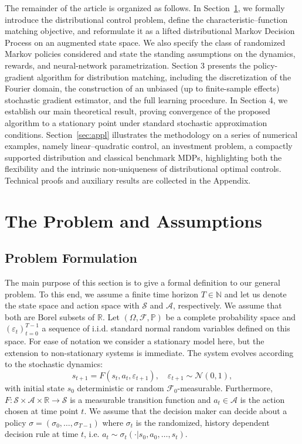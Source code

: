 \documentclass[reqno, 11pt]{amsart}%
\newcommand\cA{\mathcal A}
\newcommand\cS{\mathcal S}
\newcommand\RR{\mathbb R}
\theoremstyle{definition}
\begin{document}
The remainder of the article is organized as follows. In Section~\ref{sec:Problem+Ass}, we formally introduce the distributional control problem, define the characteristic–function matching objective, and reformulate it as a lifted distributional Markov Decision Process on an augmented state space. We also specify the class of randomized Markov policies considered and state the standing assumptions on the dynamics, rewards, and neural-network parametrization. Section 3 presents the policy-gradient algorithm for distribution matching, including the discretization of the Fourier domain, the construction of an unbiased (up to finite-sample effects) stochastic gradient estimator, and the full learning procedure. In Section 4, we establish our main theoretical result, proving convergence of the proposed algorithm to a stationary point under standard stochastic approximation conditions. Section~\ref{sec:appl} illustrates the methodology on a series of numerical examples, namely linear–quadratic control, an investment problem, a compactly supported distribution and classical benchmark MDPs, highlighting both the flexibility and the intrinsic non-uniqueness of distributional optimal controls. Technical proofs and auxiliary results are collected in the Appendix.

\section{The Problem and Assumptions}\label{sec:Problem+Ass}
\subsection{Problem Formulation}
The main purpose of this section is to give a formal definition to our general problem. To this end, we assume a finite time horizon $T\in\mathbb{N}$ and let us denote the state space and action space  with $\mathcal{S}$ and $\mathcal{A}$, respectively. We assume that both are Borel subsets of $\RR$.   Let $(\Omega, \mathcal{F}, \mathbb{P})$ be a complete probability space and $(\varepsilon_t)_{t=0}^{T-1}$ a sequence of i.i.d. standard normal random variables defined on this space. For ease of notation we consider a stationary model here, but the extension to non-stationary systems is immediate.
The system evolves according to the stochastic dynamics:
\begin{equation}
\label{eq:def:nonlinear_dynamics}
    s_{t+1} = F(s_t, a_t, \varepsilon_{t+1}), \quad \varepsilon_{t+1} \sim \mathcal{N}(0,1),
\end{equation}
with initial state $s_0$  deterministic or random $\mathcal{F}_0$-measurable. Furthermore, $F:\cS \times \cA \times \RR \to \cS$ is a measurable transition function and $a_{t}\in\mathcal A$ is the action chosen at time point $t$. We assume that the decision maker can decide about   a  policy $\sigma=(\sigma_0,\ldots,\sigma_{T-1})$ where $\sigma_t$ is the randomized, history dependent decision rule at time $t$, i.e. $a_t\sim \sigma_t(\cdot|s_0,a_0,\ldots,s_t)$.  
\end{document}
